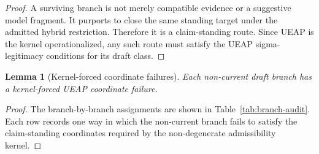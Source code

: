 \documentclass[11pt]{article}
\newtheorem{lemma}{Lemma}
\theoremstyle{definition}
\begin{document}
\begin{proof}
A surviving branch is not merely compatible evidence or a suggestive model
fragment. It purports to close the same standing target under the admitted
hybrid restriction. Therefore it is a claim-standing route. Since UEAP is the
kernel operationalized, any such route must satisfy the UEAP sigma-legitimacy
conditions for its draft class.
\end{proof}

\begin{lemma}[Kernel-forced coordinate failures]
Each non-current draft branch has a kernel-forced UEAP coordinate failure.
\end{lemma}

\begin{proof}
The branch-by-branch assignments are shown in Table~\ref{tab:branch-audit}.
Each row records one way in which the non-current branch fails to satisfy the
claim-standing coordinates required by the non-degenerate admissibility
kernel.
\end{proof}
\end{document}
